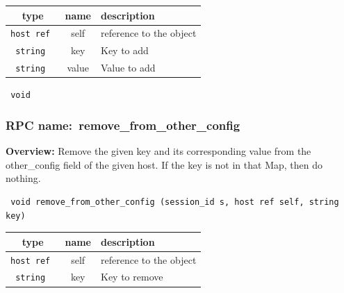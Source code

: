 
 
\vspace{0.3cm}
\begin{tabular}{|c|c|p{7cm}|}
 \hline
{\bf type} & {\bf name} & {\bf description} \\ \hline
{\tt host ref } & self & reference to the object \\ \hline 

{\tt string } & key & Key to add \\ \hline 

{\tt string } & value & Value to add \\ \hline 

\end{tabular}

\vspace{0.3cm}

{\tt 
void
}



\vspace{0.3cm}
\vspace{0.3cm}
\vspace{0.3cm}
\subsubsection{RPC name:~remove\_from\_other\_config}

{\bf Overview:} 
Remove the given key and its corresponding value from the other\_config
field of the given host.  If the key is not in that Map, then do nothing.

\begin{verbatim} void remove_from_other_config (session_id s, host ref self, string key)\end{verbatim}



 
\vspace{0.3cm}
\begin{tabular}{|c|c|p{7cm}|}
 \hline
{\bf type} & {\bf name} & {\bf description} \\ \hline
{\tt host ref } & self & reference to the object \\ \hline 

{\tt string } & key & Key to remove \\ \hline 

\end{tabular}

\vspace{0.3cm}

